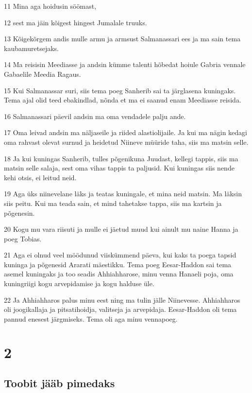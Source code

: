 \par 11 Mina aga hoidusin söömast,
\par 12 sest ma jäin kõigest hingest Jumalale truuks.
\par 13 Kõigekõrgem andis mulle armu ja armsust Salmanassari ees ja ma sain tema kaubamuretsejaks.
\par 14 Ma reisisin Meediasse ja andsin kümme talenti hõbedat hoiule Gabria vennale Gabaelile Meedia Ragaus.
\par 15 Kui Salmanassar suri, siis tema poeg Sanherib sai ta järglasena kuningaks. Tema ajal olid teed ebakindlad, nõnda et ma ei saanud enam Meediasse reisida.
\par 16 Salmanassari päevil andsin ma oma vendadele palju ande.
\par 17 Oma leivad andsin ma näljaseile ja riided alastiolijaile. Ja kui ma nägin kedagi oma rahvast olevat surnud ja heidetud Niineve müüride taha, siis ma matsin selle.
\par 18 Ja kui kuningas Sanherib, tulles põgenikuna Juudast, kellegi tappis, siis ma matsin selle salaja, sest oma vihas tappis ta paljusid. Kui kuningas siis nende kehi otsis, ei leitud neid.
\par 19 Aga üks niinevelane läks ja teatas kuningale, et mina neid matsin. Ma läksin siis peitu. Kui ma teada sain, et mind tahetakse tappa, siis ma kartsin ja põgenesin.
\par 20 Kogu mu vara riisuti ja mulle ei jäetud muud kui ainult mu naine Hanna ja poeg Tobias.
\par 21 Aga ei olnud veel möödunud viiskümmend päeva, kui kaks ta poega tapsid kuninga ja põgenesid Ararati mäestikku. Tema poeg Eesar-Haddon sai tema asemel kuningaks ja too seadis Ahhiahharose, minu venna Hanaeli poja, oma kuningriigi kogu arvepidamise ja kogu halduse üle.
\par 22 Ja Ahhiahharos palus minu eest ning ma tulin jälle Niinevesse. Ahhiahharos oli joogikallaja ja pitsatihoidja, valitseja ja arvepidaja. Eesar-Haddon oli tema pannud enesest järgmiseks. Tema oli aga minu vennapoeg.

\chapter{2}

\section*{Toobit jääb pimedaks}

